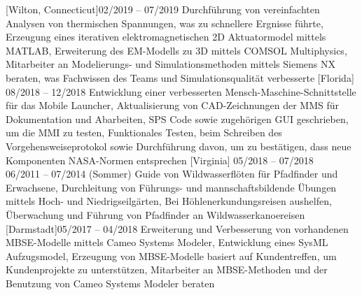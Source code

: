 \documentclass[
	themeColor=blue,
	lang=DE,
	titleStyle=1,
	jobExpStyle=1,
	eduStyle=1
]{../templates/cv_res}
\begin{document}
[Wilton, Connecticut]{02/2019 -- 07/2019}{%
	{Durchführung von vereinfachten Analysen von thermischen Spannungen, was zu schnellere Ergnisse führte},
	{Erzeugung eines iterativen elektromagnetischen 2D Aktuatormodel mittels MATLAB},
	{Erweiterung des EM-Modells zu 3D mittels COMSOL Multiphysics},
	{Mitarbeiter an Modelierungs- und Simulationsmethoden mittels Siemens NX beraten, was Fachwissen des Teams und Simulationsqualität verbesserte}
}
[Florida]{%
08/2018 -- 12/2018}{%
	{Entwicklung einer verbesserten Mensch-Maschine-Schnittstelle für das Mobile Launcher},
	{Aktualisierung von CAD-Zeichnungen der MMS für Dokumentation und Abarbeiten},
	{SPS Code sowie zugehörigen GUI geschrieben, um die MMI zu testen},
	{Funktionales Testen, beim Schreiben des Vorgehensweiseprotokol sowie Durchführung davon, um zu bestätigen, dass neue Komponenten NASA-Normen entsprechen}
}
[Virginia]{%
05/2018 -- 07/2018\\06/2011 -- 07/2014 (Sommer)}{
	{Guide von Wildwasserflöten für Pfadfinder und Erwachsene},
	{Durchleitung von Führungs- und mannschaftsbildende Übungen mittels Hoch- und Niedrigseilgärten},
	{Bei Höhlenerkundungsreisen aushelfen},
	{Überwachung und Führung von Pfadfinder an Wildwasserkanoereisen}
}
[Darmstadt]{05/2017 -- 04/2018}{%
	{Erweiterung und Verbesserung von vorhandenen MBSE-Modelle mittels Cameo Systems Modeler},
	{Entwicklung eines SysML Aufzugsmodel},
	{Erzeugung von MBSE-Modelle basiert auf Kundentreffen, um Kundenprojekte zu unterstützen},
	{Mitarbeiter an MBSE-Methoden und der Benutzung von Cameo Systems Modeler beraten}
}
\end{document}
